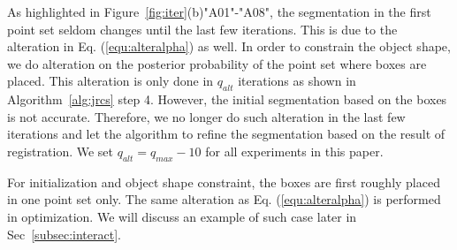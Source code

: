 As highlighted in Figure~\ref{fig:iter}(b)"A01"-"A08", the segmentation in the first point set seldom changes until the last few iterations. 
%
This is due to the alteration in Eq. (\ref{equ:alteralpha}) as well. 
%
In order to constrain the object shape, we do alteration on the posterior probability of the point set where boxes are placed. This alteration is only done in $q_{alt}$ iterations as shown in Algorithm~\ref{alg:jrcs} step 4. 
However, the initial segmentation based on the boxes is not accurate. 
Therefore, we no longer do such alteration in the last few iterations and let the algorithm to refine the segmentation based on the result of registration. 
We set $q_{alt}=q_{max}-10$ for all experiments in this paper.

For initialization and object shape constraint, the boxes are first roughly placed in one point set only. 
The same alteration as Eq. (\ref{equ:alteralpha}) is performed in optimization. We will discuss an example of such case later in Sec~\ref{subsec:interact}.
